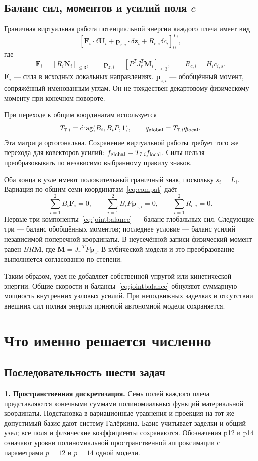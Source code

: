 \documentclass[11pt,a4paper]{article}
\newcommand{\trunc}[1]{\left[#1\right]_{\leq3}}
\begin{document}
\subsection{Баланс сил, моментов и усилий поля $c$}
Граничная виртуальная работа потенциальной энергии каждого плеча имеет вид
\[
[\mathbf F_i\cdot\delta\mathbf U_i+
\mathbf p_{z,i}\cdot\delta\mathbf z_i+R_{c,i}\delta c_i]_0^{L_i},
\]
где
\[
\mathbf F_i=\trunc{R_i\mathbf N_i},\qquad
\mathbf p_{z,i}=\trunc{P^TJ_r^T\mathbf M_i},\qquad
R_{c,i}=H_i c_{i,s}.
\]
$\mathbf F_i$ --- сила в исходных локальных направлениях. $\mathbf p_{z,i}$ --- обобщённый момент, сопряжённый именованным углам. Он не тождествен декартовому физическому моменту при конечном повороте.

При переходе к общим координатам используется
\[
T_{7,i}=\operatorname{diag}(B_i,B_iP,1),\qquad
q_{\rm global}=T_{7,i}q_{\rm local}.
\]
Эта матрица ортогональна. Сохранение виртуальной работы требует того же перехода для ковекторов усилий: $f_{\rm global}=T_{7,i}f_{\rm local}$. Силы нельзя преобразовывать по независимо выбранному правилу знаков.

Оба конца в узле имеют положительный граничный знак, поскольку $s_i=L_i$. Вариация по общим семи координатам~\eqref{eq:compat} даёт
\begin{equation}
\boxed{\sum_{i=1}^2 B_i\mathbf F_i=0,\qquad
\sum_{i=1}^2 B_iP\mathbf p_{z,i}=0,\qquad
\sum_{i=1}^2R_{c,i}=0.}
\label{eq:jointbalance}
\end{equation}
Первые три компоненты~\eqref{eq:jointbalance} --- баланс глобальных сил. Следующие три --- баланс обобщённых моментов; последнее условие --- баланс усилий независимой поперечной координаты. В неусечённой записи физический момент равен $BR\mathbf M$, где $\mathbf M=J_r^{-T}P\mathbf p_z$. В кубической модели и это преобразование выполняется согласованно по степени.

Таким образом, узел не добавляет собственной упругой или кинетической энергии. Общие скорости и балансы~\eqref{eq:jointbalance} обнуляют суммарную мощность внутренних узловых усилий. При неподвижных заделках и отсутствии внешних сил полная энергия принятой автономной модели сохраняется.

\section{Что именно решается численно}
\subsection{Последовательность шести задач}
\textbf{1. Пространственная дискретизация.} Семь полей каждого плеча представляются конечными суммами полиномиальных функций материальной координаты. Подстановка в вариационные уравнения и проекция на тот же допустимый базис дают систему Галёркина. Базис учитывает заделки и общий узел; все поля и физические коэффициенты сохраняются. Обозначения p12 и p14 означают уровни полиномиальной пространственной аппроксимации с параметрами $p=12$ и $p=14$ одной модели.
\end{document}

